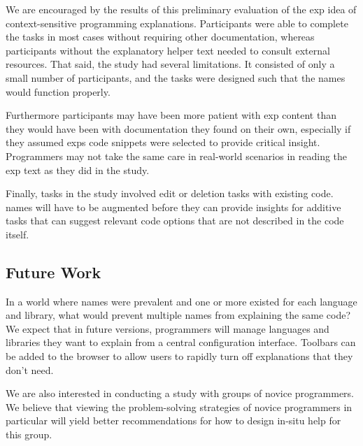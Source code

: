 We are encouraged by the results of this preliminary evaluation of the \gls{exp} idea of context-sensitive programming explanations.
Participants were able to complete the tasks in most cases without requiring other documentation, whereas participants without the explanatory helper text needed to consult external resources.
That said, the study had several limitations.  It consisted of only a small number of participants, and the tasks were designed such that the \glspl{name} would function properly. 

Furthermore participants may have been more patient with \gls{exp} content than they would have been with documentation they found on their own, especially if they assumed \glspl{exp} code snippets were selected to provide critical insight.
Programmers may not take the same care in real-world scenarios in reading the \gls{exp} text as they did in the study.

Finally, tasks in the study involved edit or deletion tasks with existing code.
\Glspl{name} will have to be augmented before they can provide insights for additive tasks that can suggest relevant code options that are not described in the code itself.

\subsection{Future Work}

In a world where \glspl{name} were prevalent and one or more existed for each language and library, what would prevent multiple \glspl{name} from explaining the same code?
We expect that in future versions, programmers will manage languages and libraries they want to explain from a central configuration interface.
Toolbars can be added to the browser to allow users to rapidly turn off explanations that they don't need.

We are also interested in conducting a study with groups of  novice programmers. We believe that viewing the problem-solving strategies of novice programmers in particular will yield better recommendations for how to design in-situ help for this group.
